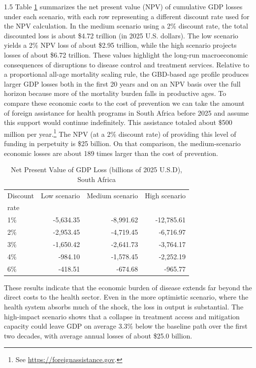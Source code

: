\documentclass[letterpaper,12pt]{article}
\theoremstyle{definition}
\begin{document}
\begin{spacing}{1.5}
Table \ref{tab:NPVLosses} summarizes the net present value (NPV) of cumulative GDP losses under each scenario, with each row representing a different discount rate used for the NPV calculation. In the medium scenario using a 2\% discount rate, the total discounted loss is about \$4.72 trillion (in 2025 U.S. dollars). The low scenario yields a 2\% NPV loss of about \$2.95 trillion, while the high scenario projects losses of about \$6.72 trillion. These values highlight the long-run macroeconomic consequences of disruptions to disease control and treatment services. Relative to a proportional all-age mortality scaling rule, the GBD-based age profile produces larger GDP losses both in the first 20 years and on an NPV basis over the full horizon because more of the mortality burden falls in productive ages. To compare these economic costs to the cost of prevention we can take the amount of foreign assistance for health programs in South Africa before 2025 and assume this support would continue indefinitely. This assistance totaled about \$500 million per year.\footnote{See \href{https://foreignassistance.gov}{https://foreignassistance.gov}.} The NPV (at a 2\% discount rate) of providing this level of funding in perpetuity is \$25 billion. On that comparison, the medium-scenario economic losses are about 189 times larger than the cost of prevention.

\begin{table}[H] \centering \captionsetup{width=6.0in}
  \caption{\label{tab:NPVLosses}Net Present Value of GDP Loss (billions of 2025 U.S.D), South Africa}
  \begin{tabular}{lrrr}
    \hline\hline
    Discount & Low scenario & Medium scenario & High scenario \\[-1.5mm]
    rate & \citet{Brink2025} & \citet{Gandhi2025} & \citet{KS2025} \\
    \hline\hline
    1\% & -5,634.35 & -8,991.62 & -12,785.61 \\
    2\% & -2,953.45 & -4,719.45 & -6,716.97 \\
    3\% & -1,650.42 & -2,641.73 & -3,764.17 \\
    4\% & -984.10 & -1,578.45 & -2,252.19 \\
    6\% & -418.51 & -674.68 & -965.77 \\
    \hline\hline
  \end{tabular}
\end{table}

These results indicate that the economic burden of disease extends far beyond the direct costs to the health sector. Even in the more optimistic scenario, where the health system absorbs much of the shock, the loss in output is substantial. The high-impact scenario shows that a collapse in treatment access and mitigation capacity could leave GDP on average 3.3\% below the baseline path over the first two decades, with average annual losses of about \$25.0 billion.


\end{spacing}
\end{document}
